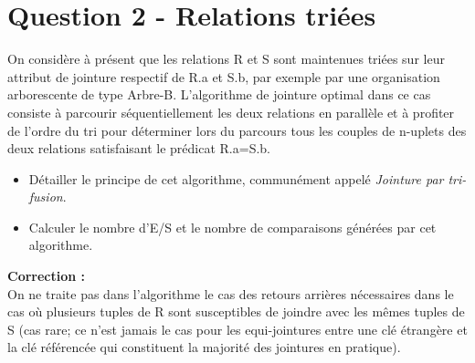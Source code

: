 \documentclass[11pt]{article}
\begin{document}
\section{Question 2 - Relations triées}
On considère à présent que les relations R et S sont maintenues triées sur leur attribut de jointure respectif de R.a et S.b, par exemple par une organisation arborescente de type Arbre-B. L'algorithme de jointure optimal dans ce cas consiste à parcourir séquentiellement les deux relations en parallèle et à profiter de l'ordre du tri pour déterminer lors du parcours tous les couples de n-uplets des deux relations satisfaisant le prédicat R.a=S.b.
\begin{itemize}
\item Détailler le principe de cet algorithme, communément appelé \textit{Jointure par tri-fusion}.
\item Calculer le nombre d'E/S et le nombre de comparaisons générées par cet algorithme.
\end{itemize}
\textbf{Correction :}\\On ne traite pas dans l'algorithme le cas des retours arrières nécessaires dans le cas où plusieurs tuples de R sont susceptibles de joindre avec les mêmes tuples de S (cas rare;  ce n'est jamais le cas pour les equi-jointures entre une clé étrangère et la clé référencée qui constituent la majorité des jointures en pratique).
\end{document}
